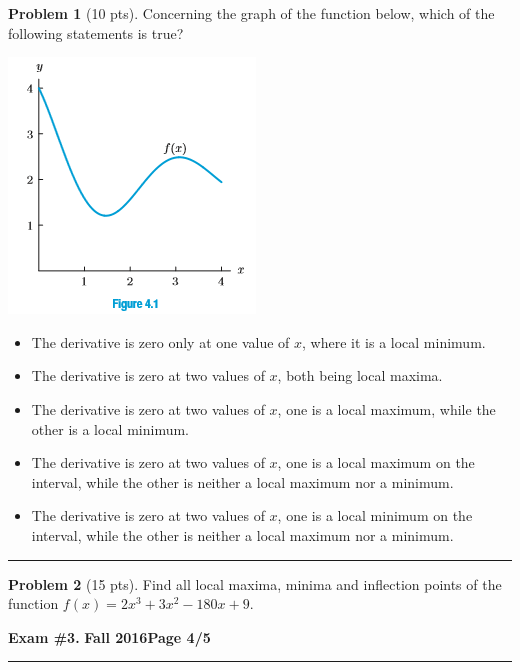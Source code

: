 \documentclass[12pt]{article}
\makeatletter
\theoremstyle{definition}
\newtheorem{problem}{Problem}
\newcommand*{\radiobutton}{%
  \@ifstar{\@radiobutton0}{\@radiobutton1}%
}
\newcommand*{\@radiobutton}[1]{%
  \begin{tikzpicture}
    \pgfmathsetlengthmacro\radius{height("X")/2}
    \draw[radius=\radius] circle;
    \ifcase#1 \fill[radius=.6*\radius] circle;\fi
  \end{tikzpicture}%
}
\makeatother
\begin{document}
\bigskip
\begin{problem}[10 pts]
Concerning the graph of the function below, which of the following statements is true?
\begin{center}
\includegraphics{3graph3}
\end{center}
\begin{itemize}
\item[\radiobutton] The derivative is zero only at one value of $x$, where it is a local minimum.
\item[\radiobutton] The derivative is zero at two values of $x$, both being local maxima.
\item[\radiobutton] The derivative is zero at two values of $x$, one is a local maximum, while the other is a local minimum.
\item[\radiobutton] The derivative is zero at two values of $x$, one is a local maximum on the interval, while the other is neither a local maximum nor a minimum.
\item[\radiobutton] The derivative is zero at two values of $x$, one is a local minimum on the interval, while the other is neither a local maximum nor a minimum.
\end{itemize}
\end{problem}

\hrule
\begin{problem}[15 pts]
Find all local maxima, minima and inflection points of the function $f(x) = 2x^3 + 3x^2-180x+9$.
\end{problem}

\newpage

\hfill{\large\bf Exam \#3.}\hfill{\large\bf
  Fall 2016}\hfill{\large\bf Page 4/5}\hrule

\bigskip
\end{document}

